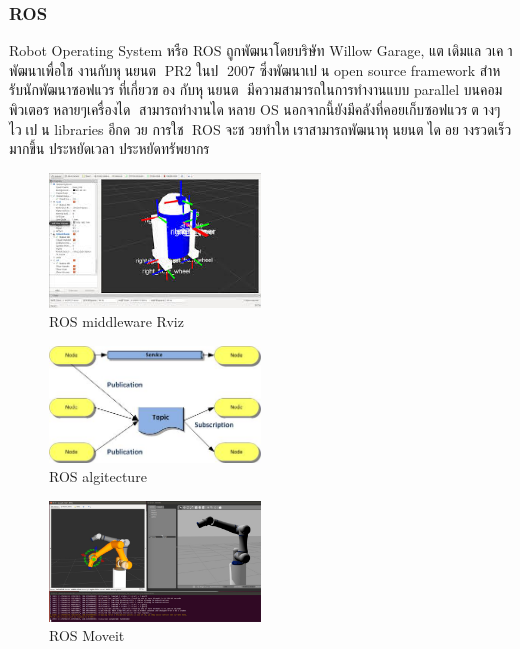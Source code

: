 \subsubsection*{ROS}
Robot Operating System หรือ ROS ถูกพัฒนาโดยบริษัท Willow Garage, แตเดิมแลวเคาพัฒนาเพื่อใช
งานกับหุนยนต PR2 ในป 2007 ซึ่งพัฒนาเปน open source framework สําหรับนักพัฒนาซอฟแวรที่เกี่ยวของ
กับหุนยนต มีความสามารถในการทํางานแบบ parallel บนคอมพิวเตอรหลายๆเครื่องได สามารถทํางานไดหลาย
OS นอกจากนี้ยังมีคลังที่คอยเก็บซอฟแวรตางๆไวเปน libraries อีกดวย การใช ROS
จะชวยทําใหเราสามารถพัฒนาหุนยนตไดอยางรวดเร็วมากขึ้น ประหยัดเวลา ประหยัดทรัพยากร

\begin{figure}[!ht]
    \centering
    \includegraphics[width=0.5\textwidth]{chapter2/images/mdw_ros.jpeg}
    \caption{ROS middleware Rviz}
    \label{fig:mdw_ros}
\end{figure}
\begin{figure}[!ht]
    \centering
    \includegraphics[width=0.5\textwidth]{chapter2/images/mdw_ros2.jpeg}
    \caption{ROS algitecture}
    \label{fig:mdw_ros2}
\end{figure}
\begin{figure}[!ht]
    \centering
    \includegraphics[width=0.5\textwidth]{chapter2/images/mdw_ros3.jpeg}
    \caption{ROS Moveit}
    \label{fig:mdw_ros3}
\end{figure}

